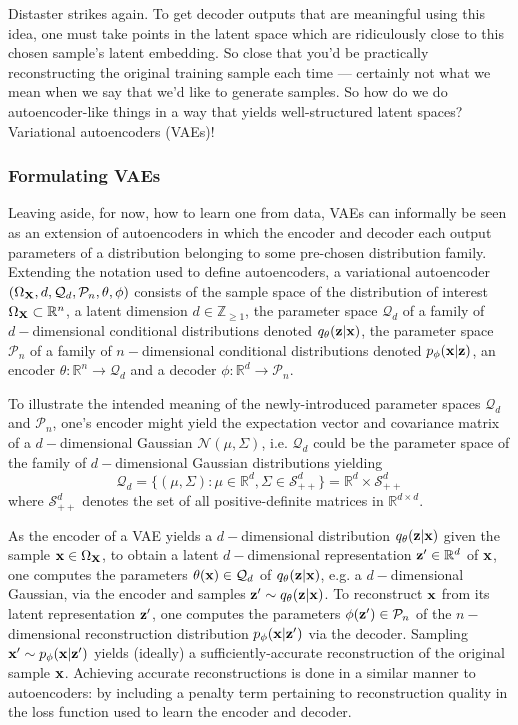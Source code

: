 \documentclass[11pt]{article}
\begin{document}
\noindent Distaster strikes again. To get decoder outputs that are meaningful using this idea, one must take points in the latent space which are ridiculously close to this chosen sample's latent embedding. So close that you'd be practically reconstructing the original training sample each time — certainly not what we mean when we say that we'd like to generate samples. So how do we do autoencoder-like things in a way that yields well-structured latent spaces? Variational autoencoders (VAEs)!

\subsubsection*{Formulating VAEs}
Leaving aside, for now, how to learn one from data, VAEs can informally be seen as an extension of autoencoders in which the encoder and decoder each output parameters of a distribution belonging to some pre-chosen distribution family. Extending the notation used to define autoencoders, a variational autoencoder $(\Omega_{\mathbf{X}},d,\mathcal{Q}_d,\mathcal{P}_n,\theta,\phi)$ consists of the sample space of the distribution of interest $\Omega_{\mathbf{X}}\subset\mathbb{R}^n$, a latent dimension $d\in\mathbb{Z}_{\geq1}$, the parameter space $\mathcal{Q}_d$ of a family of $d-$dimensional conditional distributions denoted $q_{\theta}(\mathbf{z}|\mathbf{x})$, the parameter space $\mathcal{P}_n$ of a family of $n-$dimensional conditional distributions denoted $p_{\phi}(\mathbf{x}|\mathbf{z})$, an encoder $\theta:\mathbb{R}^n\to\mathcal{Q}_d$ and a decoder $\phi:\mathbb{R}^d\to\mathcal{P}_n$.

To illustrate the intended meaning of the newly-introduced parameter spaces $\mathcal{Q}_d$ and $\mathcal{P}_n$, one's encoder might yield the expectation vector and covariance matrix of a $d-$dimensional Gaussian $\mathcal{N}(\mu,\Sigma)$, i.e. $\mathcal{Q}_d$ could be the parameter space of the family of $d-$dimensional Gaussian distributions yielding
$$
\mathcal{Q}_d
=
\{
(\mu,\Sigma):\mu\in\mathbb{R}^d, \Sigma\in\mathcal{S}_{++}^d
\}
=
\mathbb{R}^d\times\mathcal{S}_{++}^d
$$
where $\mathcal{S}_{++}^d$ denotes the set of all positive-definite matrices in $\mathbb{R}^{d\times d}$.

As the encoder of a VAE yields a $d-$dimensional distribution $q_{\theta}(\mathbf{z}|\mathbf{x})$ given the sample $\mathbf{x}\in\Omega_{\mathbf{X}}$, to obtain a latent $d-$dimensional representation $\mathbf{z}'\in\mathbb{R}^d$ of $\mathbf{x}$, one computes the parameters $\theta(\mathbf{x})\in\mathcal{Q}_d$ of $q_{\theta}(\mathbf{z}|\mathbf{x})$, e.g. a $d-$dimensional Gaussian, via the encoder and samples $\mathbf{z}'\sim q_{\theta}(\mathbf{z}|\mathbf{x})$. To reconstruct $\mathbf{x}$ from its latent representation $\mathbf{z}'$, one computes the parameters $\phi(\mathbf{z}')\in\mathcal{P}_n$ of the $n-$dimensional reconstruction distribution $p_{\phi}(\mathbf{x}|\mathbf{z}')$ via the decoder. Sampling $\mathbf{x}'\sim p_{\phi}(\mathbf{x}|\mathbf{z}')$ yields (ideally) a sufficiently-accurate reconstruction of the original sample $\mathbf{x}$. Achieving accurate reconstructions is done in a similar manner to autoencoders: by including a penalty term pertaining to reconstruction quality in the loss function used to learn the encoder and decoder.
\end{document}
